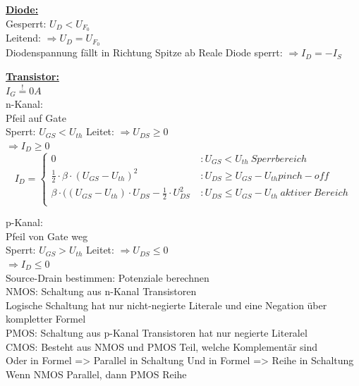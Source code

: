 \documentclass[11pt]{article}
\begin{document}
\newpage
\begin{minipage}{0.3\textwidth}

\underline{\textbf{Diode:}}\\
Gesperrt: $U_D < U_{F_0}$\\
Leitend: $\Rightarrow U_D = U_{F_0}$\\
Diodenspannung fällt in Richtung Spitze ab
Reale Diode sperrt: $\Rightarrow I_D = -I_S$

\underline{\textbf{Transistor:}}\\
$I_G \stackrel{!}{=} 0A$\\
n-Kanal:\\
\phantom{ss} Pfeil auf Gate\\
\phantom{ss} Sperrt: $U_{GS} < U_{th}$
\phantom{ss} Leitet: $\Rightarrow U_{DS} \geq 0$\\
\phantom{sssssisisssi}$\Rightarrow I_D \geq 0$\\

\[I_D = \left\{
  \begin{array}{lr}
    0 & : U_{GS} < U_{th}~Sperrbereich\\
    \frac{1}{2} \cdot \beta \cdot(U_{GS} - U_{th})^2  \ & : U_{DS} \ge U_{GS} - U_{th} pinch-off\\
       \beta \cdot((U_{GS} - U_{th}) \cdot U_{DS} - \frac{1}{2} \cdot U_{DS}^2  \ & : U_{DS} \leq U_{GS} - U_{th}~aktiver~Bereich\\
  \end{array}
\right.
\]

p-Kanal:\\
\phantom{ss} Pfeil von Gate weg\\
\phantom{ss} Sperrt: $U_{GS} > U_{th}$
\phantom{ss} Leitet: $\Rightarrow U_{DS} \leq 0$\\
\phantom{sssssisisssi}$\Rightarrow I_D \leq 0$\\

Source-Drain bestimmen: Potenziale berechnen\\
NMOS: Schaltung aus n-Kanal Transistoren\\
\phantom{ss} Logische Schaltung hat nur nicht-negierte Literale und eine Negation über kompletter Formel\\
PMOS: Schaltung aus p-Kanal Transistoren hat nur negierte Literalel\\
CMOS: Besteht aus NMOS und PMOS Teil, welche Komplementär sind\\
Oder in Formel => Parallel in Schaltung
Und in Formel => Reihe in Schaltung
\phantom{ss} Wenn NMOS Parallel, dann PMOS Reihe\\
\end{minipage}%
\end{document}

